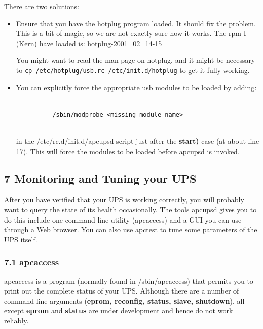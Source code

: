 {{{{There are two solutions:  

\begin{itemize}
\item Ensure that you have the hotplug program loaded. It should fix the
problem. This is a bit of magic, so we are not exactly sure how it works. The
rpm I (Kern) have loaded is: hotplug-2001\_02\_14-15  

You might want to read the man page on hotplug, and it might be necessary to
{\tt cp /etc/hotplug/usb.rc /etc/init.d/hotplug} to get it fully working.  
\item You can explicitly force the appropriate usb modules to be loaded by
adding:  

\footnotesize
\begin{verbatim}
          
          /sbin/modprobe <missing-module-name>
     
\end{verbatim}
\normalsize

in the /etc/rc.d/init.d/apcupsd script just after the {\bf start)} case (at
about line 17). This will force the modules to be loaded before apcupsd is
invoked. 
\end{itemize}

\label{Monitoring-and-Tuning-your-UPS}

\subsection*{7 Monitoring and Tuning your UPS}

\label{index-Monitoring-109}
\label{index-Tuning-110}
After you have verified that your UPS is working correctly, you will probably
want to query the state of its health occasionally. The tools apcupsd gives
you to do this include one command-line utility (apcaccess) and a GUI you can
use through a Web browser.  You can also use apctest to tune some parameters
of the UPS itself. 

\label{apcaccess}

\subsubsection*{7.1 apcaccess}

\label{index-apcaccess-111}
apcaccess is a program (normally found in /sbin/apcaccess) that permits you to
print out the complete status of your UPS. Although there are a number of
command line arguments ({\bf eprom, reconfig, status, slave, shutdown}), all
except {\bf eprom} and {\bf status} are under development and hence do not
work reliably.  

}}}}
